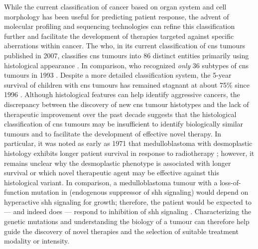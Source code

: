 While the current classification of cancer based on organ system and cell morphology has been useful for predicting patient response, the advent of molecular profiling and sequencing technologies can refine this classification further and facilitate the development of therapies targeted against specific aberrations within cancer. The \gls{who}, in its current classification of \gls{cns} tumours published in 2007, classifies \gls{cns} tumours into 86 distinct entities primarily using histological appearance . In comparison, \gls{who} recognized \emph{only} 36 subtypes of \gls{cns} tumours in 1993 . Despite a more detailed classification system, the 5-year survival of children with \gls{cns} tumours has remained stagnant at about 75\% since 1996 . Although histological features can help identify aggressive cancers, the discrepancy between the discovery of new \gls{cns} tumour histotypes and the lack of therapeutic improvement over the past decade suggests that the histological classification of \gls{cns} tumours may be insufficient to identify biologically similar tumours and to facilitate the development of effective novel therapy. In particular, it was noted as early as 1971 that medulloblastoma with desmoplastic histology exhibits longer patient survival in response to radiotherapy ; however, it remains unclear why the desmoplastic phenotype is associated with longer survival or which novel therapeutic agent may be effective against this histological variant. In comparison, a medulloblastoma tumour with a loss-of-function mutation in  (endogenous suppressor of \gls{shh} signaling) would depend on hyperactive \gls{shh} signaling for growth; therefore, the patient would be expected to --- and indeed does --- respond to inhibition of \gls{shh} signaling . Characterizing the genetic mutations and understanding the biology of a tumour can therefore help guide the discovery of novel therapies and the selection of suitable treatment modality or intensity.


